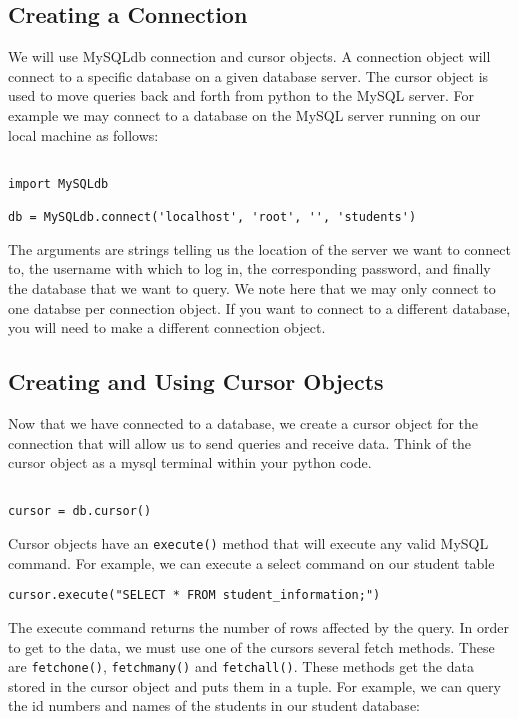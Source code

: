 \subsection{Creating a Connection}

We will use MySQLdb connection and cursor objects.  A connection object will connect to a specific database on a given database server.  The cursor object is used to move queries back and forth from python to the MySQL server.  For example we may connect to a database on the MySQL server running on our local machine as follows:

\begin{lstlisting}

import MySQLdb

db = MySQLdb.connect('localhost', 'root', '', 'students')

\end{lstlisting}

The arguments are strings telling us the location of the server we want to connect to, the username with which to log in, the corresponding password, and finally the database that we want to query.  We note here that we may only connect to one databse per connection object.  If you want to connect to a different database, you will need to make a different connection object.

\subsection{Creating and Using Cursor Objects}

Now that we have connected to a database, we create a cursor object for the connection that will allow us to send queries and receive data.  Think of the cursor object as a mysql terminal within your python code.

\begin{lstlisting}

cursor = db.cursor()

\end{lstlisting}

Cursor objects have an {\tt execute()} method that will execute any valid MySQL command.  For example, we can execute a select command on our student table

\begin{lstlisting}
cursor.execute("SELECT * FROM student_information;")

\end{lstlisting}

The execute command returns the number of rows affected by the query.  In order to get to the data, we must use one of the cursors several fetch methods.  These are {\tt fetchone()}, {\tt fetchmany()} and {\tt fetchall()}.  These methods get the data stored in the cursor object and puts them in a tuple.  For example, we can query the id numbers and names of the students in our student database:

